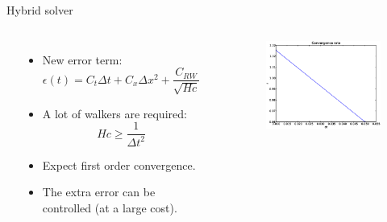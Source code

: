 \documentclass[12pt,a4paper, xcolor={usenames,dvipsnames,svgnames,table}]{beamer}
\begin{document}
\begin{frame}[shrink]{Hybrid solver}
\begin{columns}
 \vspace{5pt}\\
 \begin{itemize}
 \item <2-> New error term:
 \begin{equation*}
   \epsilon(t) = C_t \Delta t + C_x \Delta x^2 + \frac{C_{RW}}{\sqrt{Hc}}
 \end{equation*}
 \item <2-> A lot of walkers are required:
 \begin{equation*}
  Hc \geq \frac{1}{\Delta t^2}
 \end{equation*}
  \item <3-> Expect first order convergence.
  \item <4-> The extra error can be controlled (at a large cost).
 \end{itemize}
\vspace{5pt}\\
\begin{figure}[H]
 \centering
  \includegraphics[width=\textwidth]{../../results/experiment_15042014_0608_convergence_tests_etc/results/ConvergenceTest.eps}
\end{figure}
\end{columns}
\end{frame}
\notetoself{}
\end{document}
